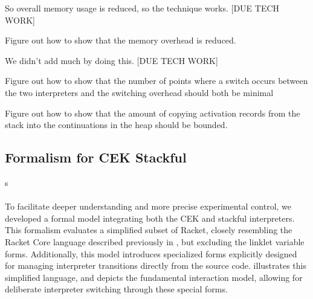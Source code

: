       \begin{paragraph-here}
        So overall memory usage is reduced, so the technique works. [DUE TECH WORK]
      \end{paragraph-here}

      \begin{todo}
        Figure out how to show that the memory overhead is reduced.
      \end{todo}

      \begin{paragraph-here}
        We didn't add much by doing this. [DUE TECH WORK]
      \end{paragraph-here}

      \begin{todo}
        Figure out how to show that the number of points where a switch occurs between the two interpreters and the switching overhead should both be minimal
      \end{todo}

      \begin{todo}
        Figure out how to show that the amount of copying activation records from the stack into the continuations in the heap should be bounded.
      \end{todo}

    \subsection{Formalism for CEK \+ Stackful}

s
      \paragraph{}%
        To facilitate deeper understanding and more precise experimental control, we developed a formal model integrating both the CEK and stackful interpreters. This formalism evaluates a simplified subset of Racket, closely resembling the Racket Core language described previously in , but excluding the linklet variable forms. Additionally, this model introduces specialized  forms explicitly designed for managing interpreter transitions directly from the source code.  illustrates this simplified language, and  depicts the fundamental interaction model, allowing for deliberate interpreter switching through these special forms.

